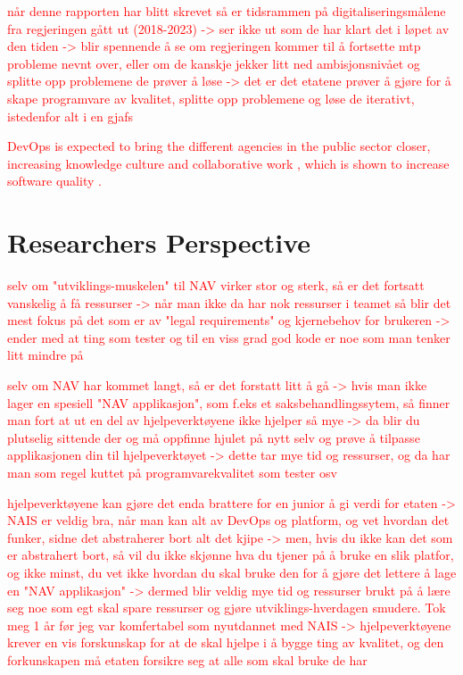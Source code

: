 \textcolor{red}{når denne rapporten har blitt skrevet så er tidsrammen på digitaliseringsmålene fra regjeringen gått ut (2018-2023) -> ser ikke ut som de har klart det i løpet av den tiden -> blir spennende å se om regjeringen kommer til å fortsette mtp probleme nevnt over, eller om de kanskje jekker litt ned ambisjonsnivået og splitte opp problemene de prøver å løse -> det er det etatene prøver å gjøre for å skape programvare av kvalitet, splitte opp problemene og løse de iterativt, istedenfor alt i en gjafs}

\textcolor{red}{DevOps is expected to bring the different agencies in the public sector closer, increasing knowledge culture and collaborative work \cite{mm_2021}, which is shown to increase software quality \cite{smm_2018}.}


\section{Researchers Perspective}
\textcolor{red}{selv om "utviklings-muskelen" til NAV virker stor og sterk, så er det fortsatt vanskelig å få ressurser -> når man ikke da har nok ressurser i teamet så blir det mest fokus på det som er av "legal requirements" og kjernebehov for brukeren -> ender med at ting som tester og til en viss grad god kode er noe som man tenker litt mindre på}

\textcolor{red}{selv om NAV har kommet langt, så er det forstatt litt å gå -> hvis man ikke lager en spesiell "NAV applikasjon", som f.eks et saksbehandlingssytem, så finner man fort at ut en del av hjelpeverktøyene ikke hjelper så mye -> da blir du plutselig sittende der og må oppfinne hjulet på nytt selv og prøve å tilpasse applikasjonen din til hjelpeverktøyet -> dette tar mye tid og ressurser, og da har man som regel kuttet på programvarekvalitet som tester osv}

\textcolor{red}{hjelpeverktøyene kan gjøre det enda brattere for en junior å gi verdi for etaten -> NAIS er veldig bra, når man kan alt av DevOps og platform, og vet hvordan det funker, sidne det abstraherer bort alt det kjipe -> men, hvis du ikke kan det som er abstrahert bort, så vil du ikke skjønne hva du tjener på å bruke en slik platfor, og ikke minst, du vet ikke hvordan du skal bruke den for å gjøre det lettere å lage en "NAV applikasjon" -> dermed blir veldig mye tid og ressurser brukt på å lære seg noe som egt skal spare ressurser og gjøre utviklings-hverdagen smudere. Tok meg 1 år før jeg var komfertabel som nyutdannet med NAIS -> hjelpeverktøyene krever en vis forskunskap for at de skal hjelpe i å bygge ting av kvalitet, og den forkunskapen må etaten forsikre seg at alle som skal bruke de har}

